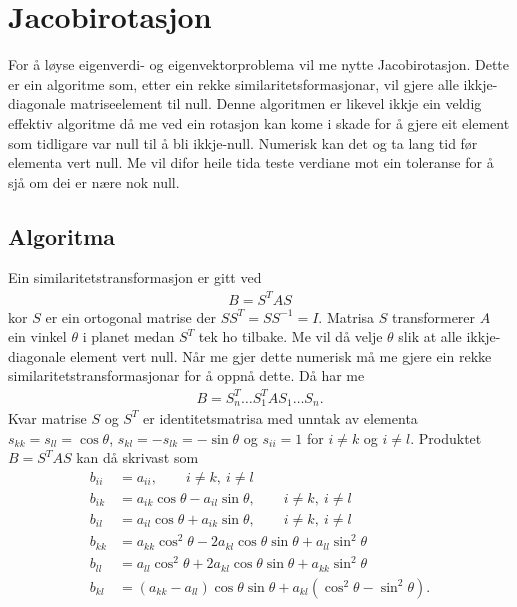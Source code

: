 \documentclass[11pt, a4paper]{article}
\begin{document}
\section{Jacobirotasjon}
  For å løyse eigenverdi- og eigenvektorproblema vil me nytte Jacobirotasjon. Dette er ein algoritme som, etter ein rekke similaritetsformasjonar, vil 
  gjere alle ikkje-diagonale matriseelement til null. Denne algoritmen er likevel ikkje ein veldig effektiv algoritme då me ved ein rotasjon kan kome 
  i skade for å gjere eit element som tidligare var null til å bli ikkje-null. Numerisk kan det og ta lang tid før elementa vert null. Me vil difor heile 
  tida teste verdiane mot ein toleranse for å sjå om dei er nære nok null.

\subsection{Algoritma}
    Ein similaritetstransformasjon er gitt ved 
    \begin{align*}
      B = S^TAS
    \end{align*}
    kor $S$ er ein ortogonal matrise der $SS^T = SS^{-1} = I$. Matrisa $S$ transformerer $A$ ein vinkel $\theta$ i planet medan $S^T$ tek ho tilbake.
    Me vil då velje $\theta$ slik at alle ikkje-diagonale element vert null. Når me gjer dette numerisk må me gjere ein rekke similaritetstransformasjonar 
    for å oppnå dette. Då har me
    \begin{align*}
      B = S_n^T \dots S_1^TAS_1 \dots S_n.
    \end{align*}
    Kvar matrise $S$ og $S^T$ er identitetsmatrisa med unntak av elementa $s_{kk} = s_{ll} = \cos{\theta}$, $s_{kl} = -s_{lk} = -\sin{\theta}$ og 
    $s_{ii} = 1$ for $i \ne k$ og $i \ne l$. Produktet $B = S^TAS$ kan då skrivast som
    \begin{align*}
      b_{ii} &= a_{ii}, \qquad i \ne k, \ i \ne l \\
      b_{ik} &= a_{ik}\cos{\theta} - a_{il}\sin{\theta}, \qquad i \ne k, \ i \ne l \\
      b_{il} &= a_{il}\cos{\theta} + a_{ik}\sin{\theta}, \qquad i \ne k, \ i \ne l \\
      b_{kk} &= a_{kk}\cos^2{\theta} - 2a_{kl}\cos{\theta}\sin{\theta} + a_{ll}\sin^2{\theta} \\
      b_{ll} &= a_{ll}\cos^2{\theta} + 2a_{kl}\cos{\theta}\sin{\theta} + a_{kk}\sin^2{\theta} \\
      b_{kl} &= (a_{kk} - a_{ll})\cos{\theta}\sin{\theta} + a_{kl}(\cos^2{\theta} - \sin^2{\theta}).
    \end{align*}
\end{document}
